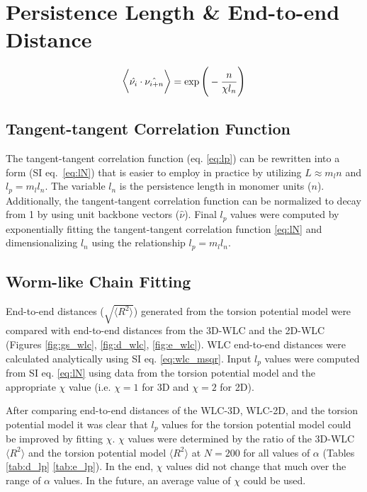 \section{Persistence Length \& End-to-end Distance}
\label{sec:lp}
\begin{equation}
\Large
\Big \langle \large \hat{\nu_i} \cdot \hat{\nu_{i+n}} \Big \rangle = \exp{\bigg(-\frac{n}{\chi l_{n}}\bigg)}
\label{eq:lN}
\end{equation}

\subsection{Tangent-tangent Correlation Function}

The tangent-tangent correlation function (eq. \ref{eq:lp}) can be rewritten into a form (SI eq.~\ref{eq:lN}) that is easier to employ in practice by utilizing $L \approx m_ln$ and $l_p = m_ll_n$. The variable $l_n$ is the persistence length in monomer units ($n$). Additionally, the tangent-tangent correlation function can be normalized to decay from 1 by using unit backbone vectors ($\hat{\nu}$). Final $l_p$ values were computed by exponentially fitting the tangent-tangent correlation function \ref{eq:lN} and dimensionalizing $l_n$ using the relationship $l_p = m_ll_n$.

\subsection{Worm-like Chain Fitting}

End-to-end distances ($\sqrt{\big \langle R^2 \big \rangle}$) generated from the torsion potential model were compared with end-to-end distances from the 3D-WLC and the 2D-WLC (Figures \ref{fig:gs_wlc}, \ref{fig:d_wlc}, \ref{fig:e_wlc}). WLC end-to-end distances were calculated analytically using SI eq. \ref{eq:wlc_msqr}. Input $l_p$ values were computed from SI eq. \ref{eq:lN} using data from the torsion potential model and the appropriate $\chi$ value (i.e. $\chi = 1$ for 3D and $\chi = 2$ for 2D).

After comparing end-to-end distances of the WLC-3D, WLC-2D, and the torsion potential model it was clear that $l_p$ values for the torsion potential model could be improved by fitting $\chi$. $\chi$ values were determined by the ratio of the 3D-WLC $\big \langle R^2 \big \rangle$ and the torsion potential model $\big \langle R^2 \big \rangle$ at $N = 200$ for all values of $\alpha$ (Tables \ref{tab:d_lp} \ref{tab:e_lp}). In the end, $\chi$ values did not change that much over the range of $\alpha$ values. In the future, an average value of $\chi$ could be used.

